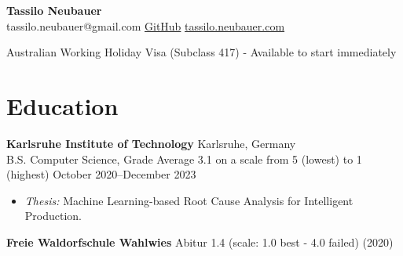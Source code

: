 \documentclass[letterpaper, 9pt]{article}
\newcommand{\header}[4]{
    \begin{center}
        \textbf{\Huge{#1}}\\
        \small{
            \textcolor{accent}{#2} \hspace{1em}
            \href{#3}{GitHub}\hspace{1em}
            \href{#4}{tassilo.neubauer.com}
        }
    \end{center}
}
\begin{document}
\header{Tassilo Neubauer}{tassilo.neubauer@gmail.com}{https://github.com/sonofhypnos}{https://www.tassiloneubauer.com/}

\ifdefined\AustraliaVersion
    \begin{center}
    \small{Australian Working Holiday Visa (Subclass 417) - Available to start immediately}
    \end{center}
\fi

\section*{Education}
\textbf{Karlsruhe Institute of Technology} \hfill Karlsruhe, Germany \\
B.S. Computer Science, Grade Average 3.1 on a scale from 5 (lowest) to 1 (highest) \hfill October 2020--December 2023
\begin{itemize}
    \item \textit{Thesis:} Machine Learning-based Root Cause Analysis for Intelligent Production.
\end{itemize}
\textbf{Freie Waldorfschule Wahlwies} \hfill Abitur 1.4 (scale: 1.0 best - 4.0 failed) (2020)
\end{document}
